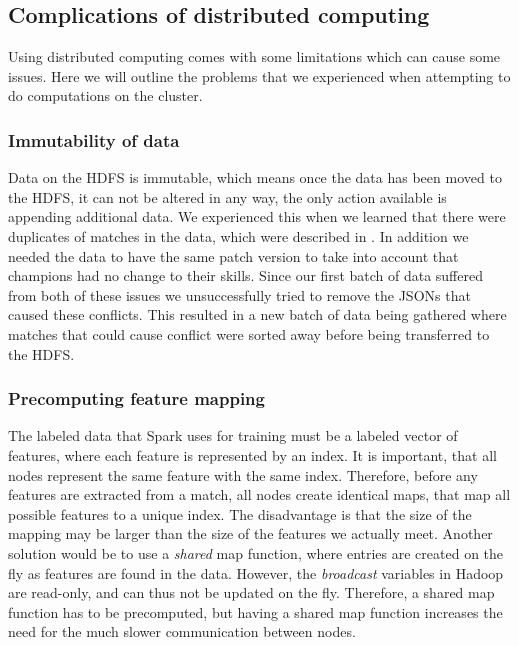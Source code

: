 \subsection{Complications of distributed computing}\label{sec:complications}
Using distributed computing comes with some limitations which can cause some issues. Here we will outline the problems that we experienced when attempting to do computations on the cluster.

\subsubsection{Immutability of data}
Data on the HDFS is immutable, which means once the data has been moved to the HDFS, it can not be altered in any way, the only action available is appending additional data. We experienced this when we learned that there were duplicates of matches in the data, which were described in . In addition we needed the data to have the same patch version to take into account that champions had no change to their skills. Since our first batch of data suffered from both of these issues we unsuccessfully tried to remove the JSONs that caused these conflicts. This resulted in a new batch of data being gathered where matches that could cause conflict were sorted away before being transferred to the HDFS.   


\subsubsection{Precomputing feature mapping}
The labeled data that Spark uses for training must be a labeled vector of features, where each feature is represented by an index.
It is important, that all nodes represent the same feature with the same index. Therefore, before any features are extracted from a match, all nodes create identical maps, that map all possible features to a unique index. The disadvantage is that the size of the mapping may be larger than the size of the features we actually meet.
Another solution would be to use a \emph{shared} map function, where entries are created on the fly as features are found in the data.
However, the \emph{broadcast} variables in Hadoop are read-only, and can thus not be updated on the fly.
Therefore, a shared map function has to be precomputed, but having a shared map function increases the need for the much slower communication between nodes.


